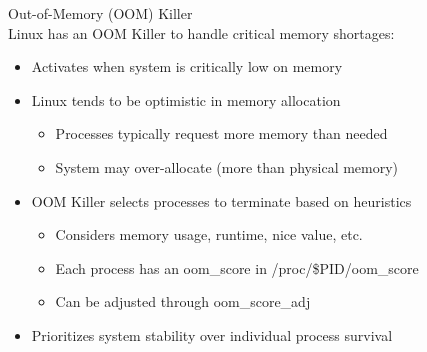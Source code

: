 \begin{definition}{Out-of-Memory (OOM) Killer}\\
    Linux has an OOM Killer to handle critical memory shortages:
    \begin{itemize}
        \item Activates when system is critically low on memory
        \item Linux tends to be optimistic in memory allocation
            \begin{itemize}
                \item Processes typically request more memory than needed
                \item System may over-allocate (more than physical memory)
            \end{itemize}
        \item OOM Killer selects processes to terminate based on heuristics
            \begin{itemize}
                \item Considers memory usage, runtime, nice value, etc.
                \item Each process has an oom\_score in /proc/\$PID/oom\_score
                \item Can be adjusted through oom\_score\_adj
            \end{itemize}
        \item Prioritizes system stability over individual process survival
    \end{itemize}
\end{definition}


